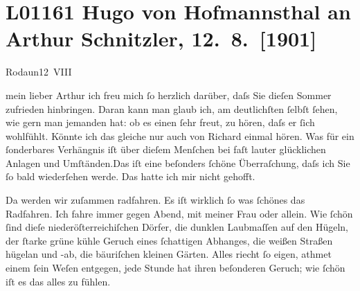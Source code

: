 

\section[Hugo von Hofmannsthal an Arthur Schnitzler, 12. 8. {[}1901{]}]{L01161 Hugo von Hofmannsthal an Arthur Schnitzler, 12. 8. {[}1901{]}}
\nopagebreak{}
\rehead{ }\normalsize\beginnumbering{}
\toendnotes[C]{\smallbreak\pagebreak[2]}
\toendnotes[C]{\smallbreak}
\pstart
           \raggedleft{}{\pb}Rodaun12 VIII\pend
           
\pstart{}mein lieber Arthur \pend\vspace{0.5em}
\pstart
           ich freu mich ſo herzlich darüber, daſs Sie dieſen Sommer zufrieden hinbringen. Daran
               kann man glaub ich, am deutlichſten ſelbſt ſehen, wie gern man jemanden hat: ob es
               einen ſehr freut, zu hören, daſs er ſich wohlfühlt. Könnte ich das gleiche nur auch
               von Richard einmal hören. Was für ein
               ſonderbares Verhängnis iſt über dieſem Menſchen bei faſt lauter glücklichen Anlagen
               und Umſtänden.\hspace*{1.5em}Das iſt {\pb}eine beſonders ſchöne
               Überraſchung, daſs ich Sie ſo bald wiederſehen werde. Das hatte ich mir nicht
               gehofft.\pend
           
\pstart
           Da werden wir zuſammen radfahren. Es iſt wirklich ſo was ſchönes das Radfahren. Ich
               fahre immer gegen Abend, mit meiner Frau oder allein. Wie ſchön ſind dieſe niederöſterreichiſchen Dörfer, die dunklen Laubmaſſen auf den
               Hügeln, der ſtarke grüne kühle Geruch eines ſchattigen Abhanges, die weißen Straßen
               hügelan und -ab, die bäuriſchen kleinen Gärten. Alles riecht ſo eigen, athmet einem
               ſein {\pb}Weſen entgegen, jede Stunde
               hat ihren beſonderen Geruch; wie ſchön iſt es das alles zu fühlen.\pend
           
